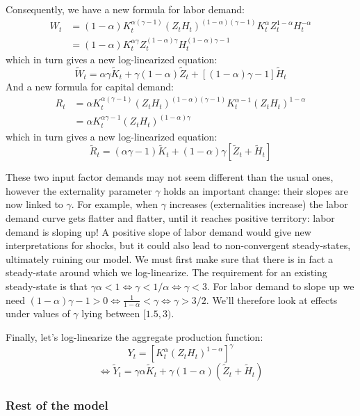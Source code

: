 \documentclass[12pt]{report}
\begin{document}
Consequently, we have a new formula for labor demand: \begin{align*} 
W_t & =  (1 - \alpha)K_t^{\alpha(\gamma - 1)}(Z_tH_{t})^{(1-\alpha)(\gamma - 1)}  K_{t}^{\alpha} Z_t^{1-\alpha} H_{t}^{-\alpha} \\
& = (1 - \alpha) K_t^{\alpha\gamma} Z_t^{(1-\alpha)\gamma} H_{t}^{(1-\alpha)\gamma - 1}
\end{align*}
which in turn gives a new log-linearized equation: $$\tilde{W}_t = \alpha\gamma \tilde K_t +\gamma(1-\alpha) \tilde Z_t + [(1-\alpha)\gamma - 1] \tilde H_t $$ And a new formula for capital demand:\begin{align*} 
R_t & =  \alpha K_t^{\alpha(\gamma - 1)}(Z_tH_{t})^{(1-\alpha)(\gamma - 1)}  K_{t}^{\alpha - 1} (Z_tH_{t})^{1-\alpha} \\
& = \alpha K_t^{\alpha\gamma - 1} (Z_tH_{t})^{(1-\alpha)\gamma}
\end{align*}
which in turn gives a new log-linearized equation: $$\tilde{R}_t = (\alpha\gamma - 1)\tilde K_t +(1-\alpha)\gamma [\tilde Z_t +  \tilde H_t] $$

These two input factor demands may not seem different than the usual ones, however the externality parameter $\gamma$ holds an important change: their slopes are now linked to $\gamma$. For example, when $\gamma$ increases (externalities increase) the labor demand curve gets flatter and flatter, until it reaches positive territory: labor demand is sloping up! A positive slope of labor demand would give new interpretations for shocks, but it could also lead to non-convergent steady-states, ultimately ruining our model. We must first make sure that there is in fact a steady-state around which we log-linearize. The requirement for an existing steady-state is that $\gamma\alpha < 1 \Leftrightarrow \gamma < 1/\alpha \Leftrightarrow \gamma<3$. For labor demand to slope up we need $(1-\alpha)\gamma - 1 > 0 \Leftrightarrow \frac{1}{1-\alpha} < \gamma \Leftrightarrow \gamma > 3/2$. We'll therefore look at effects under values of $\gamma$ lying between $[1.5 , 3)$.

Finally, let's log-linearize the aggregate production function: $$ Y_t = \left[ K_{t}^\alpha (Z_tH_{t})^{1-\alpha}\right]^{\gamma} $$ $$\Leftrightarrow \tilde Y_t = \gamma\alpha \tilde K_t + \gamma(1-\alpha)(\tilde Z_t + \tilde H_t) $$ 

\subsubsection{Rest of the model}
\end{document}
